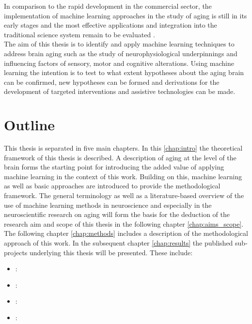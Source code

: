 In comparison to the rapid development in the commercial sector, the implementation of machine learning approaches in the study of aging is still in its early stages and the most effective applications and integration into the traditional science system remain to be evaluated \cite{Bzdok2019}.\\
The aim of this thesis is to identify and apply machine learning techniques to address brain aging such as the study of neurophysiological underpinnings and influencing factors of sensory, motor and cognitive alterations. Using machine learning the intention is to test to what extent hypotheses about the aging brain can be confirmed, new hypotheses can be formed and derivations for the development of targeted interventions and assistive technologies can be made.

\section{Outline}
This thesis is separated in five main chapters. In this \autoref{chap:intro} the theoretical framework of this thesis is described. A description of aging at the level of the brain forms the starting point for introducing the added value of applying machine learning in the context of this work. Building on this, machine learning as well as  basic approaches are introduced to provide the methodological framework. The general terminology as well as a literature-based overview of the use of machine learning methods in neuroscience and especially in the neuroscientific research on aging will form the basis for the deduction of the research aim and scope of this thesis in the following chapter \autoref{chap:aims_scope}. The following chapter \autoref{chap:methods} includes a description of the methodological approach of this work. In the subsequent chapter \autoref{chap:results} the published sub-projects underlying this thesis will be presented. These include:
\begin{itemize}
\item {}:\\ 
\item {}:\\ 
\item {}:\\ 
\item {}:\\ 
\end{itemize}
